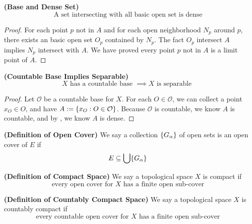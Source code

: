 \documentclass{report}
\begin{document}
\begin{theorem}
\label{2.6.4}
\textbf{(Base and Dense Set)} 
\begin{equation}
\text{ A set intersecting with all basic open set is dense }
\end{equation}
\end{theorem}
\begin{proof}
For each point $p$ not in $A$ and for each open neighborhood $N_p$ around $p$, there exists an basic open set  $O_p$ contained by $N_p$. The fact  $O_p$ intersect $A$ implies  $N_p$ intersect with  $A$. We have proved every point  $p$ not in $A $ is a limit point of $A$.
\end{proof}
\begin{corollary}
\label{2.6.5}
\textbf{(Countable Base Implies Separable)} 
\begin{equation}
X\text{ has a countable base }\implies X\text{ is separable }
\end{equation}
\end{corollary}
\begin{proof}
Let $\mathcal{O}$ be a countable base for $X$. For each $O\in \mathcal{O}$, we can collect a point $x_O\in O$, and have $A:=\{ x_O:O\in \mathcal{O} \}$. Because $\mathcal{O}$ is countable, we know $A$ is countable, and by  , we know $A$ is dense.
\end{proof}
\begin{definition}
\label{2.6.6}
\textbf{(Definition of Open Cover)} We say a collection $\{ G_\alpha   \}$ of open sets is an open cover of $E$ if 
\begin{equation}
E\subseteq \bigcup \{ G_\alpha  \}
\end{equation}
\end{definition}
\begin{definition}
\label{2.6.7}
\textbf{(Definition of Compact Space)} We say a topological space $X$ is compact if  
\begin{equation}
\text{every open cover for $X$ has a finite open sub-cover}
\end{equation}
\end{definition}
\begin{definition}
\label{2.6.8}
\textbf{(Definition of Countably Compact Space)} We say a topological space $X$ is countably compact if 
\begin{equation}
\text{every countable open cover for $X$ has a finite open sub-cover}
\end{equation}
\end{definition}
\end{document}
